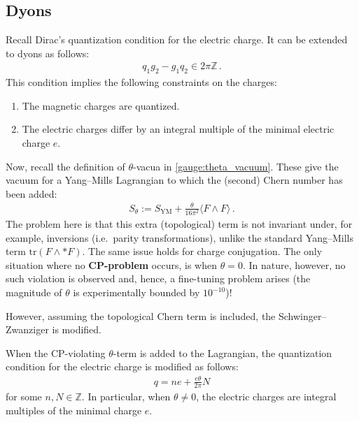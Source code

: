 \subsection{Dyons}


    \begin{property}
        Recall Dirac's quantization condition for the electric charge.  It can be extended to dyons as follows:
        \begin{gather}
            q_1g_2-g_1q_2 \in 2\pi\mathbb{Z}\,.
        \end{gather}
        This condition implies the following constraints on the charges:
        \begin{enumerate}
            \item The magnetic charges are quantized.
            \item The electric charges differ by an integral multiple of the minimal electric charge $e$.
        \end{enumerate}
    \end{property}


    Now, recall the definition of $\theta$-vacua in \cref{gauge:theta_vacuum}. These give the vacuum for a Yang--Mills Lagrangian to which the (second) Chern number has been added:
    \begin{gather}
        S_\theta := S_{\text{YM}} + \frac{\theta}{16\pi^2}\langle F\wedge F\rangle\,.
    \end{gather}
    The problem here is that this extra (topological) term is not invariant under, for example, inversions (i.e.~parity transformations), unlike the standard Yang--Mills term $\mathrm{tr}(F\wedge\ast F)$. The same issue holds for charge conjugation. The only situation where no \textbf{CP-problem} occurs, is when $\theta=0$. In nature, however, no such violation is observed and, hence, a fine-tuning problem arises (the magnitude of $\theta$ is experimentally bounded by $10^{-10}$)!

    However, assuming the topological Chern term is included, the Schwinger--Zwanziger is modified.
    \begin{property}
        When the CP-violating $\theta$-term is added to the Lagrangian, the quantization condition for the electric charge is modified as follows:
        \begin{gather}
            q = ne + \frac{e\theta}{2\pi}N
        \end{gather}
        for some $n,N\in\mathbb{Z}$. In particular, when $\theta\neq0$, the electric charges are integral multiples of the minimal charge $e$.
    \end{property}

